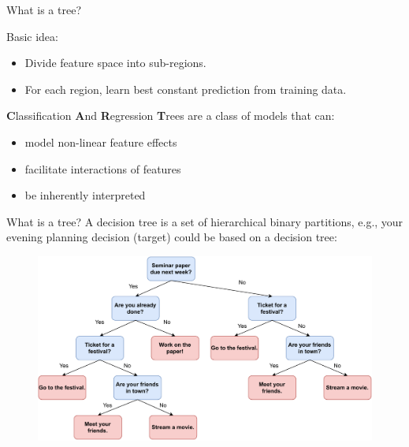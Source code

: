 \documentclass[11pt,compress,t,notes=noshow, xcolor=table]{beamer}
\begin{document}
\begin{vbframe}{What is a tree?}

Basic idea: 
\begin{itemize}
\item Divide feature space into sub-regions.%
\item For each region, learn best constant prediction from  training data. %
\end{itemize}

\vspace{0.5cm}

    \textbf{C}lassification \textbf{A}nd \textbf{R}egression \textbf{T}rees are a class of models that can:
  \begin{itemize}
    \item model non-linear feature effects
    \item facilitate interactions of features
    \item be inherently interpreted
  \end{itemize}
\end{vbframe}

\begin{vbframe}{What is a tree?}
A decision tree is a set of hierarchical binary partitions, e.g., your evening planning decision (target) could be based on a decision tree:

  \begin{figure}
    \centering
\includegraphics[width=1\textwidth, keepaspectratio]{figure/nutshell-example.pdf}
    \end{figure}


\end{vbframe}
\end{document}
